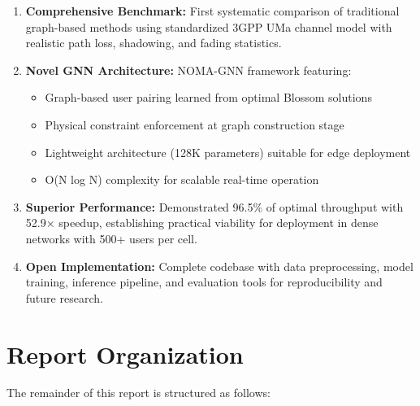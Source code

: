 \begin{enumerate}
    \item \textbf{Comprehensive Benchmark:} First systematic comparison of traditional graph-based methods using standardized 3GPP UMa channel model with realistic path loss, shadowing, and fading statistics.
    
    \item \textbf{Novel GNN Architecture:} NOMA-GNN framework featuring:
    \begin{itemize}
        \item Graph-based user pairing learned from optimal Blossom solutions
        \item Physical constraint enforcement at graph construction stage
        \item Lightweight architecture (128K parameters) suitable for edge deployment
        \item O(N log N) complexity for scalable real-time operation
    \end{itemize}
    
    \item \textbf{Superior Performance:} Demonstrated 96.5\% of optimal throughput with 52.9× speedup, establishing practical viability for deployment in dense networks with 500+ users per cell.
    
    \item \textbf{Open Implementation:} Complete codebase with data preprocessing, model training, inference pipeline, and evaluation tools for reproducibility and future research.
\end{enumerate}

\section{Report Organization}

The remainder of this report is structured as follows:

